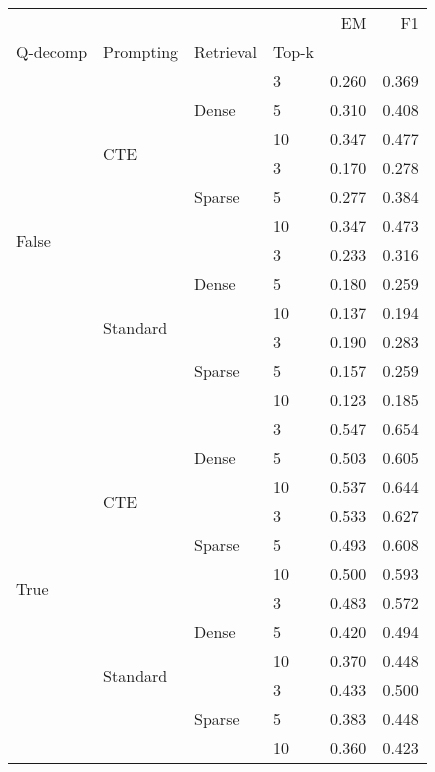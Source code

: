 \begin{tabular}{llllrr}
\toprule
 &  &  &  & EM & F1 \\
Q-decomp & Prompting & Retrieval & Top-k &  &  \\
\midrule
\multirow[t]{12}{*}{False} & \multirow[t]{6}{*}{CTE} & \multirow[t]{3}{*}{Dense} & 3 & 0.260 & 0.369 \\
 &  &  & 5 & 0.310 & 0.408 \\
 &  &  & 10 & 0.347 & 0.477 \\
\cline{3-6}
 &  & \multirow[t]{3}{*}{Sparse} & 3 & 0.170 & 0.278 \\
 &  &  & 5 & 0.277 & 0.384 \\
 &  &  & 10 & 0.347 & 0.473 \\
\cline{2-6} \cline{3-6}
 & \multirow[t]{6}{*}{Standard} & \multirow[t]{3}{*}{Dense} & 3 & 0.233 & 0.316 \\
 &  &  & 5 & 0.180 & 0.259 \\
 &  &  & 10 & 0.137 & 0.194 \\
\cline{3-6}
 &  & \multirow[t]{3}{*}{Sparse} & 3 & 0.190 & 0.283 \\
 &  &  & 5 & 0.157 & 0.259 \\
 &  &  & 10 & 0.123 & 0.185 \\
\cline{1-6} \cline{2-6} \cline{3-6}
\multirow[t]{12}{*}{True} & \multirow[t]{6}{*}{CTE} & \multirow[t]{3}{*}{Dense} & 3 & 0.547 & 0.654 \\
 &  &  & 5 & 0.503 & 0.605 \\
 &  &  & 10 & 0.537 & 0.644 \\
\cline{3-6}
 &  & \multirow[t]{3}{*}{Sparse} & 3 & 0.533 & 0.627 \\
 &  &  & 5 & 0.493 & 0.608 \\
 &  &  & 10 & 0.500 & 0.593 \\
\cline{2-6} \cline{3-6}
 & \multirow[t]{6}{*}{Standard} & \multirow[t]{3}{*}{Dense} & 3 & 0.483 & 0.572 \\
 &  &  & 5 & 0.420 & 0.494 \\
 &  &  & 10 & 0.370 & 0.448 \\
\cline{3-6}
 &  & \multirow[t]{3}{*}{Sparse} & 3 & 0.433 & 0.500 \\
 &  &  & 5 & 0.383 & 0.448 \\
 &  &  & 10 & 0.360 & 0.423 \\
\cline{1-6} \cline{2-6} \cline{3-6}
\bottomrule
\end{tabular}
